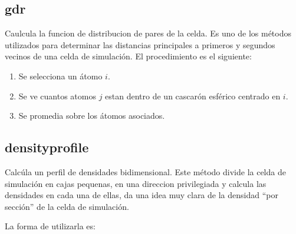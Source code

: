 \subsection{gdr}
Caulcula la funcion de distribucion de pares de la celda. Es uno de los m\'etodos utilizados para determinar las distancias principales a primeros y segundos vecinos de una celda de simulaci\'on. El procedimiento es el siguiente:
\begin{enumerate}
 \item Se selecciona un \'atomo $i$.
 \item Se ve cuantos atomos $j$ estan dentro de un cascar\'on esf\'erico centrado en $i$.
 \item Se promedia sobre los \'atomos asociados.
\end{enumerate}


\subsection{densityprofile}
Calc\'ula un perfil de densidades bidimensional. Este m\'etodo divide la celda de simulaci\'on en cajas pequenas, en una direccion privilegiada y calcula las densidades en cada una de ellas, da una idea muy clara de la densidad ``por secci\'on'' de la celda de simulaci\'on.

La forma de utilizarla es:


